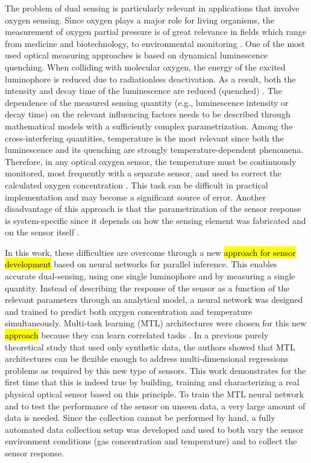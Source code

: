 \documentclass[sensors,article,submit,moreauthors,pdftex,10pt,a4paper]{Definitions/mdpi}
\begin{document}
The problem of dual sensing is particularly relevant in applications that involve oxygen sensing. Since oxygen plays a major role for living organisms, the measurement of oxygen partial pressure is of great relevance in fields which range from medicine and  biotechnology, to environmental monitoring \cite{Papkovsky2013,Wang2014}. One of the most used optical measuring approaches is based on dynamical luminescence quenching. When colliding with molecular oxygen, the energy of the excited luminophore is reduced due to radiationless deactivation. As a result, both the intensity and decay time of the luminescence are reduced (quenched) \cite{Lakowicz2006}. The dependence of the measured sensing quantity (e.g., luminescence intensity or decay time) on the relevant influencing factors needs to be described through mathematical models with a sufficiently complex parametrization. Among the cross-interfering quantities, temperature is the most relevant since both the luminescence and its quenching are strongly temperature-dependent phenomena. Therefore, in any optical oxygen sensor, the temperature must be continuously monitored, most frequently with a separate sensor, and used to correct the calculated oxygen concentration \cite{Li2015}. This task can be difficult in practical implementation and may become a significant source of error. Another disadvantage of this approach is that the parametrization of the sensor response is system-specific since it depends on how the sensing element was fabricated and on the sensor itself \cite{Xu1994,Draxler1995,Hartmann1996,Mills1998,Badocco2008,Dini2011}.

In this work, these difficulties are overcome through a new \hl{approach for sensor development} based on neural networks for parallel inference. This enables  accurate dual-sensing, using one single luminophore and by measuring a single quantity.
Instead of describing the response of the sensor as a function of the relevant parameters through an analytical model, a neural network was designed and trained to predict both oxygen concentration and temperature simultaneously.
Multi-task learning (MTL) architectures were chosen for this new \hl{approach} because they can learn correlated tasks \cite{Argyriou2006, Thrun1996, Caruana1997, Zhang2017, Baxter2000, Thung2018}. In a previous purely theoretical study that used only synthetic data, the authors showed that MTL architectures can be flexible enough to address multi-dimensional regressions problems \cite{Michelucci2019_2} as required by this new type of sensors. This work demonstrates for the first time that this is indeed true by building, training and characterizing a real physical optical sensor based on this principle.
To train the MTL neural network and to test the performance of the sensor on unseen data, a very large amount of data is needed. Since the collection  cannot be performed by hand, a fully automated data collection setup was developed and used to both vary the sensor environment conditions (gas concentration and temperature) and to collect the sensor response. 
\end{document}
